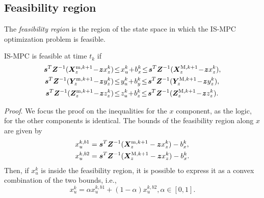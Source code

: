 \subsection{Feasibility region}

The {\em feasibility region} is the region of the state space in which the IS-MPC optimization problem is feasible.

\medskip
\begin{proposition}
\label{prop:feasibility}
IS-MPC is feasible at time $t_k$ if
\begin{align}
\label{eq:FAPA:mpc-feasibility-constraint}
\bm{s}^T \bm{Z}^{-1} (\bm{X}_z^{{\rm m}, k+1} \!-\! \bm{z} x_z^k)  \!&\le\! x_u^k \!+\! b_x^k \!\le\! \bm{s}^T \bm{Z}^{-1} (\bm{X}_z^{{\rm M}, k+1} \!-\! \bm{z} x_z^k),
\nonumber\\
\bm{s}^T \bm{Z}^{-1} (\bm{Y}_z^{{\rm m}, k+1} \!-\! \bm{z} y_z^k)  \!&\le\! y_u^k \!+\! b_y^k \!\le\! \bm{s}^T \bm{Z}^{-1} (\bm{Y}_z^{{\rm M}, k+1} \!-\! \bm{z} y_z^k),
\nonumber\\
\bm{s}^T \bm{Z}^{-1} (\bm{Z}_z^{{\rm m}, k+1} \!-\! \bm{z} z_z^k)  \!&\le\! z_u^k \!+\! b_z^k \!\le\! \bm{s}^T \bm{Z}^{-1} (\bm{Z}_z^{{\rm M}, k+1} \!-\! \bm{z} z_z^k).
\end{align}
\end{proposition}
{\em Proof}.
We focus the proof on the inequalities for the $x$ component, as the logic, for the other components is identical. The bounds of the feasibility region along $x$ are given by
\begin{align*}
x_u^{k,b1} &= \bm{s}^T \bm{Z}^{-1} (\bm{X}_z^{{\rm m}, k+1} - \bm{z} x_z^k) - b_x^k, \\
x_u^{k,b2} &= \bm{s}^T \bm{Z}^{-1} (\bm{X}_z^{{\rm M}, k+1} - \bm{z} x_z^k) - b_x^k.
\end{align*}
Then, if $x_u^k$ is inside the feasibility region, it is possible to express it as a convex combination of the two bounds, i.e.,
\begin{equation}\label{eq:FAPA:xu_convex}
x_u^k = \alpha x_u^{k,b1} + (1-\alpha)x_u^{k,b2}, \alpha \in [0, 1].
\end{equation}

